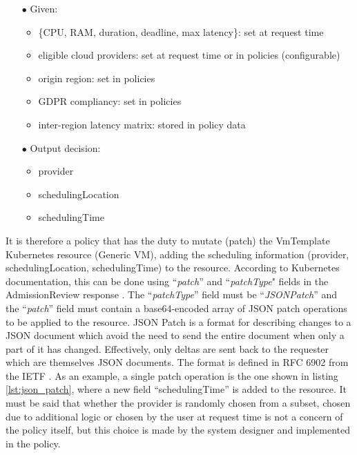 \begin{itemize}[itemsep=0.2pt, topsep=0.2pt]
  \item[$\bullet$] Given:
  \begin{itemize}[label=$\circ$]
    \item \{CPU, RAM, duration, deadline, max latency\}: set at request time
    \item eligible cloud providers: set at request time or in policies (configurable)
    \item origin region: set in policies
    \item GDPR compliancy: set in policies
    \item inter-region latency matrix: stored in policy data
  \end{itemize}
  \item[$\bullet$] Output decision:
  \begin{itemize}[label=$\circ$]
    \item provider
    \item schedulingLocation
    \item schedulingTime
  \end{itemize}
\end{itemize}

It is therefore a policy that has the duty to mutate (patch) the VmTemplate Kubernetes resource (Generic VM), adding the scheduling information (provider, schedulingLocation, schedulingTime) to the resource.
According to Kubernetes documentation, this can be done using ``\textit{patch}'' and ``\textit{patchType}" fields in the AdmissionReview response \cite{kubernetes_dynamic_admission_control}.
The ``\textit{patchType}'' field must be ``\textit{JSONPatch}'' and the ``\textit{patch}'' field must contain a base64-encoded array of JSON patch operations to be applied to the resource.
JSON Patch is a format for describing changes to a JSON document which avoid the need to send the entire document when only a part of it has changed. 
Effectively, only deltas are sent back to the requester which are themselves JSON documents.
The format is defined in RFC 6902 from the IETF \cite{json_patch}.
As an example, a single patch operation is the one shown in listing \ref{lst:json_patch}, where a new field ``schedulingTime'' is added to the resource.
It must be said that whether the provider is randomly chosen from a subset, chosen due to additional logic or chosen by the user at request time is not a concern of the policy itself, but this choice is made by the system designer and implemented in the policy.

